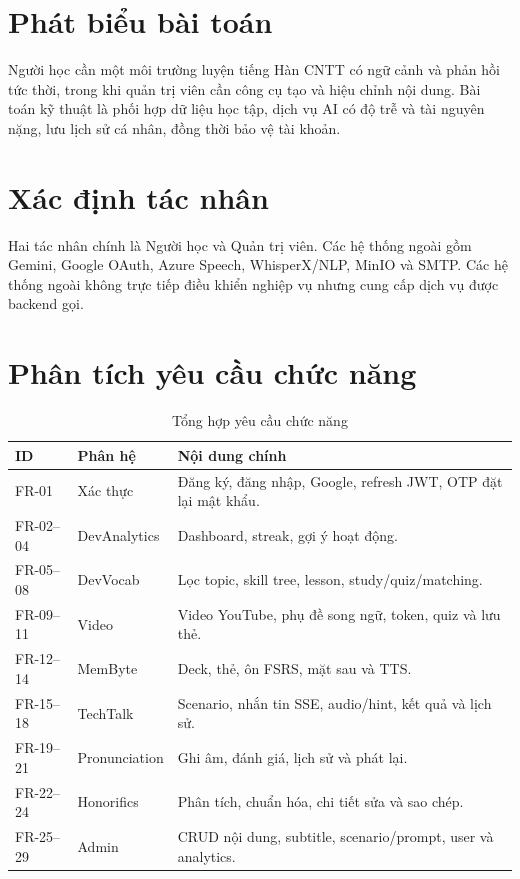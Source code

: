 \documentclass[12pt,a4paper]{report}
\begin{document}
\section{Phát biểu bài toán}
Người học cần một môi trường luyện tiếng Hàn CNTT có ngữ cảnh và phản hồi tức thời, trong khi quản trị viên cần công cụ tạo và hiệu chỉnh nội dung. Bài toán kỹ thuật là phối hợp dữ liệu học tập, dịch vụ AI có độ trễ và tài nguyên nặng, lưu lịch sử cá nhân, đồng thời bảo vệ tài khoản.

\section{Xác định tác nhân}
Hai tác nhân chính là Người học và Quản trị viên. Các hệ thống ngoài gồm Gemini, Google OAuth, Azure Speech, WhisperX/NLP, MinIO và SMTP. Các hệ thống ngoài không trực tiếp điều khiển nghiệp vụ nhưng cung cấp dịch vụ được backend gọi.

\section{Phân tích yêu cầu chức năng}
\begin{longtable}{p{}p{}p{}}
\caption{Tổng hợp yêu cầu chức năng}\label{tab:fr}\\
\toprule ID & Phân hệ & Nội dung chính\\\midrule
FR-01 & Xác thực & Đăng ký, đăng nhập, Google, refresh JWT, OTP đặt lại mật khẩu.\\
FR-02--04 & DevAnalytics & Dashboard, streak, gợi ý hoạt động.\\
FR-05--08 & DevVocab & Lọc topic, skill tree, lesson, study/quiz/matching.\\
FR-09--11 & Video & Video YouTube, phụ đề song ngữ, token, quiz và lưu thẻ.\\
FR-12--14 & MemByte & Deck, thẻ, ôn FSRS, mặt sau và TTS.\\
FR-15--18 & TechTalk & Scenario, nhắn tin SSE, audio/hint, kết quả và lịch sử.\\
FR-19--21 & Pronunciation & Ghi âm, đánh giá, lịch sử và phát lại.\\
FR-22--24 & Honorifics & Phân tích, chuẩn hóa, chi tiết sửa và sao chép.\\
FR-25--29 & Admin & CRUD nội dung, subtitle, scenario/prompt, user và analytics.\\
\bottomrule
\end{longtable}
\end{document}
